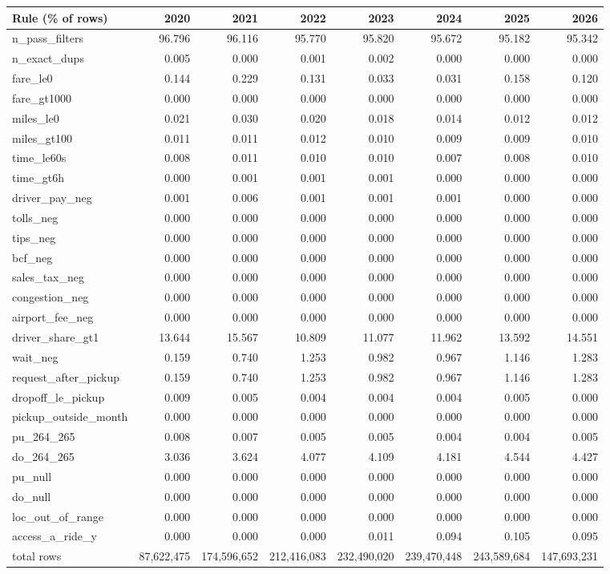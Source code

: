 \begin{tabular}{lrrrrrrr}
\toprule
Rule (\% of rows) & 2020 & 2021 & 2022 & 2023 & 2024 & 2025 & 2026 \\
\midrule
n\_pass\_filters & 96.796 & 96.116 & 95.770 & 95.820 & 95.672 & 95.182 & 95.342 \\
n\_exact\_dups & 0.005 & 0.000 & 0.001 & 0.002 & 0.000 & 0.000 & 0.000 \\
fare\_le0 & 0.144 & 0.229 & 0.131 & 0.033 & 0.031 & 0.158 & 0.120 \\
fare\_gt1000 & 0.000 & 0.000 & 0.000 & 0.000 & 0.000 & 0.000 & 0.000 \\
miles\_le0 & 0.021 & 0.030 & 0.020 & 0.018 & 0.014 & 0.012 & 0.012 \\
miles\_gt100 & 0.011 & 0.011 & 0.012 & 0.010 & 0.009 & 0.009 & 0.010 \\
time\_le60s & 0.008 & 0.011 & 0.010 & 0.010 & 0.007 & 0.008 & 0.010 \\
time\_gt6h & 0.000 & 0.001 & 0.001 & 0.001 & 0.000 & 0.000 & 0.000 \\
driver\_pay\_neg & 0.001 & 0.006 & 0.001 & 0.001 & 0.001 & 0.000 & 0.000 \\
tolls\_neg & 0.000 & 0.000 & 0.000 & 0.000 & 0.000 & 0.000 & 0.000 \\
tips\_neg & 0.000 & 0.000 & 0.000 & 0.000 & 0.000 & 0.000 & 0.000 \\
bcf\_neg & 0.000 & 0.000 & 0.000 & 0.000 & 0.000 & 0.000 & 0.000 \\
sales\_tax\_neg & 0.000 & 0.000 & 0.000 & 0.000 & 0.000 & 0.000 & 0.000 \\
congestion\_neg & 0.000 & 0.000 & 0.000 & 0.000 & 0.000 & 0.000 & 0.000 \\
airport\_fee\_neg & 0.000 & 0.000 & 0.000 & 0.000 & 0.000 & 0.000 & 0.000 \\
driver\_share\_gt1 & 13.644 & 15.567 & 10.809 & 11.077 & 11.962 & 13.592 & 14.551 \\
wait\_neg & 0.159 & 0.740 & 1.253 & 0.982 & 0.967 & 1.146 & 1.283 \\
request\_after\_pickup & 0.159 & 0.740 & 1.253 & 0.982 & 0.967 & 1.146 & 1.283 \\
dropoff\_le\_pickup & 0.009 & 0.005 & 0.004 & 0.004 & 0.004 & 0.005 & 0.000 \\
pickup\_outside\_month & 0.000 & 0.000 & 0.000 & 0.000 & 0.000 & 0.000 & 0.000 \\
pu\_264\_265 & 0.008 & 0.007 & 0.005 & 0.005 & 0.004 & 0.004 & 0.005 \\
do\_264\_265 & 3.036 & 3.624 & 4.077 & 4.109 & 4.181 & 4.544 & 4.427 \\
pu\_null & 0.000 & 0.000 & 0.000 & 0.000 & 0.000 & 0.000 & 0.000 \\
do\_null & 0.000 & 0.000 & 0.000 & 0.000 & 0.000 & 0.000 & 0.000 \\
loc\_out\_of\_range & 0.000 & 0.000 & 0.000 & 0.000 & 0.000 & 0.000 & 0.000 \\
access\_a\_ride\_y & 0.000 & 0.000 & 0.000 & 0.011 & 0.094 & 0.105 & 0.095 \\
total rows & 87,622,475 & 174,596,652 & 212,416,083 & 232,490,020 & 239,470,448 & 243,589,684 & 147,693,231 \\
\bottomrule
\end{tabular}
